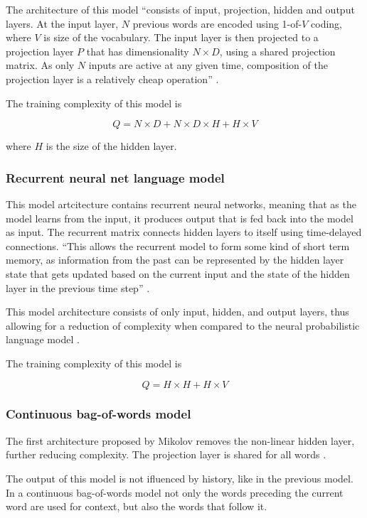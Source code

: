 \documentclass[14pt, a4paper]{extreport}
\begin{document}
The architecture of this model ``consists of input, projection, hidden and output layers. At the input layer, \(N\) previous words are encoded using 1-of-\(V\) coding, where \(V\) is size of the vocabulary. The input layer is then projected to a projection layer \(P\) that has dimensionality \(N \times D\), using a shared projection matrix. As only \(N\) inputs are active at any given time, composition of the projection layer is a relatively cheap operation'' \parencite{mikolov}.

The training complexity of this model is

\[Q = N \times D + N \times D \times H + H \times V\]

where \(H\) is the size of the hidden layer.


\subsubsection{Recurrent neural net language model}
This model artcitecture contains recurrent neural networks, meaning that as the model learns from the input, it produces output that is fed back into the model as input. The recurrent matrix connects hidden layers to itself using time-delayed connections. ``This allows the recurrent model to form some kind of short term memory, as information from the past can be represented by the hidden layer state that gets updated based on the current input and the state of the hidden layer in the previous time step'' \parencite{mikolov}.

This model architecture consists of only input, hidden, and output layers, thus allowing for a reduction of complexity when compared to the neural probabilistic language model \parencite{mikolov}.

The training complexity of this model is

\[Q = H \times H + H \times V\]

\subsubsection{Continuous bag-of-words model}

The first architecture proposed by Mikolov removes the non-linear hidden layer, further reducing complexity. The projection layer is shared for all words \parencite{mikolov}.

The output of this model is not ifluenced by history, like in the previous model. In a continuous bag-of-words model not only the words preceding the current word are used for context, but also the words that follow it.
\end{document}
